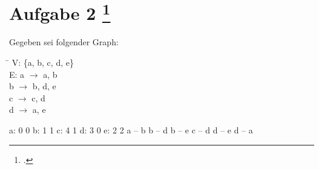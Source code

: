 \documentclass{lehramt-informatik-aufgabe}
\begin{document}
\section{Aufgabe 2
\footcite{46114:2008:09}}

Gegeben sei folgender Graph:

\begin{tabbing}
\hspace{1cm} \= \hspace{3cm} \kill
V: \> \{a, b, c, d, e\} \\
E: \> a $\rightarrow$ a, b \\
\> b $\rightarrow$ b, d, e \\
\> c $\rightarrow$ c, d \\
\> d $\rightarrow$ a, e \\
\end{tabbing}

\begin{liGraphenFormat}
a: 0 0
b: 1 1
c: 4 1
d: 3 0
e: 2 2
a -- b
b -- d
b -- e
c -- d
d -- e
d -- a
\end{liGraphenFormat}
\end{document}
